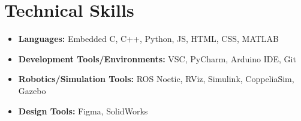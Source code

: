 \section*{Technical Skills}
%
%
%
\begin{itemize}
  \item \textbf{Languages:} Embedded C, C++, Python, JS, HTML, CSS, MATLAB
  \item \textbf{Development Tools/Environments:} VSC, PyCharm, Arduino IDE, Git
  \item \textbf{Robotics/Simulation Tools:} ROS Noetic, RViz, Simulink, CoppeliaSim, Gazebo
  \item \textbf{Design Tools:} Figma, SolidWorks
\end{itemize}